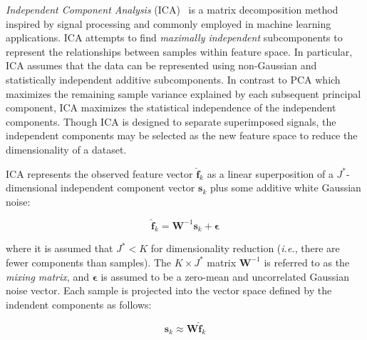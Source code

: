 \textit{Independent Component Analysis} (ICA)~\cite{hyvarinen2000ica} is a matrix decomposition method inspired by signal processing and commonly employed in machine learning applications. ICA attempts to find \textit{maximally independent} subcomponents to represent the relationships between samples within feature space. In particular, ICA assumes that the data can be represented using non-Gaussian and statistically independent additive subcomponents. In contrast to PCA which maximizes the remaining sample variance explained by each subsequent principal component, ICA maximizes the statistical independence of the independent components. Though ICA is designed to separate superimposed signals, the independent components may be selected as the new feature space to reduce the dimensionality of a dataset.


ICA represents the observed feature vector $\boldsymbol{\hat{f}}_{k}$ as a linear superposition of a $J^{*}$-dimensional independent component vector $\boldsymbol{s}_{k}$ plus some additive white Gaussian noise:

\begin{equation}
\label{eqn:chap10-ica-project}
\boldsymbol{\hat{f}}_{k} = \boldsymbol{W}^{-1}\boldsymbol{s}_{k} + \boldsymbol{\epsilon}
\end{equation}

\noindent where it is assumed that $J^{*} < K$ for dimensionality reduction (\textit{i.e.}, there are fewer components than samples). The $K \times J^{*}$ matrix $\boldsymbol{W}^{-1}$ is referred to as the \textit{mixing matrix}, and $\boldsymbol{\epsilon}$ is assumed to be a zero-mean and uncorrelated Gaussian noise vector. Each sample is projected into the vector space defined by the indendent components as follows:

\begin{equation}
\label{eqn:chap10-ica-inverse}
\boldsymbol{s}_{k} \approx \boldsymbol{W}\boldsymbol{\hat{f}}_{k}
\end{equation}

